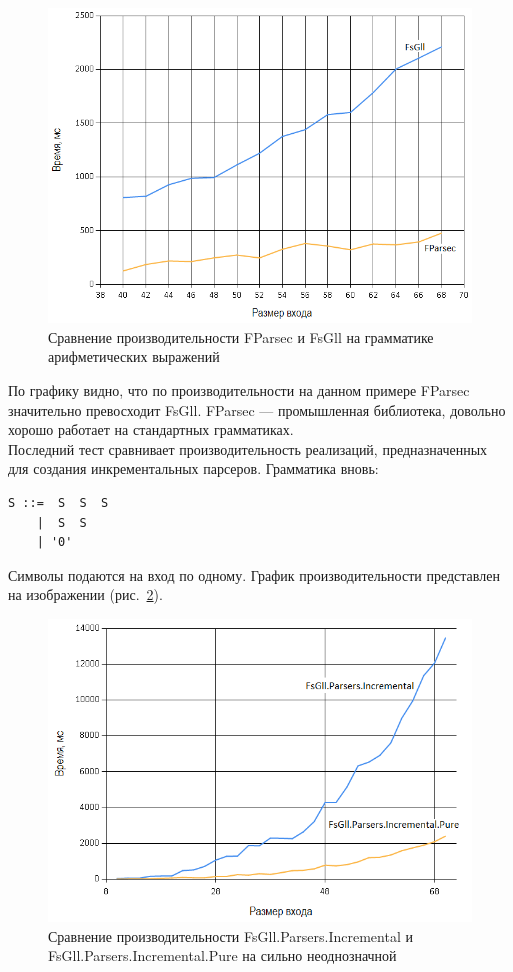 \documentclass[14pt]{matmex-diploma}
\begin{document}
\begin{figure}[!h]
  \label{ec_fparsec_fsgll_1}
  \centering
  \includegraphics[width=15cm]{pics/graph2.png}
  \caption{Сравнение производительности FParsec и FsGll на грамматике арифметических выражений}
\end{figure}
\FloatBarrier

По графику видно, что по производительности на данном примере FParsec значительно превосходит FsGll. FParsec --- промышленная библиотека, довольно хорошо работает на стандартных грамматиках.
\\
Последний тест сравнивает производительность реализаций, предназначенных для создания 
инкрементальных парсеров. Грамматика вновь:
\begin{lstlisting}
S ::=  S  S  S 
    |  S  S 
    | '0'
\end{lstlisting}
Символы подаются на вход по одному. 
График производительности представлен на изображении (рис.~\ref{nnn_fsgll_incr}). \\

	
\begin{figure}[!h]
  \label{nnn_fsgll_incr}
  \centering
  \includegraphics[width=15cm]{pics/graph3.png}
  \caption{Сравнение производительности FsGll.Parsers.Incremental и FsGll.Parsers.Incremental.Pure на сильно неоднозначной}
\end{figure}
\FloatBarrier
\end{document}

